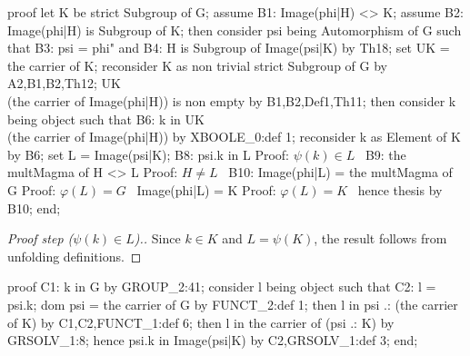 \nwenddocs{}\endmoddef\nwstartdeflinemarkup{}\nwenddeflinemarkup
proof
  let K be strict Subgroup of G;
  assume B1: Image(phi|H) <> K;
  assume B2: Image(phi|H) is Subgroup of K;
  then consider psi being Automorphism of G such that
  B3: psi = phi" and
  B4: H is Subgroup of Image(psi|K)
  by Th18;
  set UK = the carrier of K;
  reconsider K as non trivial strict Subgroup of G by A2,B1,B2,Th12;
  UK \\ (the carrier of Image(phi|H)) is non empty by B1,B2,Def1,Th11;
  then consider k being object such that
  B6: k in UK \\ (the carrier of Image(phi|H))
  by XBOOLE_0:def 1;
  reconsider k as Element of K by B6;
  set L = Image(psi|K);
  B8: psi.k in L
  \LA{}Proof: $\psi(k)\in L$~{\nwtagstyle{}}\RA{}
  B9: the multMagma of H <> L
  \LA{}Proof: $H\neq L$~{\nwtagstyle{}}\RA{}
  B10: Image(phi|L) = the multMagma of G
  \LA{}Proof: $\varphi(L)=G$~{\nwtagstyle{}}\RA{}
  Image(phi|L) = K
  \LA{}Proof: $\varphi(L) = K$~{\nwtagstyle{}}\RA{}
  hence thesis by B10;
end;
\nwendcode{}\nwdocspar

\begin{proof}[Proof step ($\psi(k)\in L$).]
Since $k\in K$ and $L=\psi(K)$, the result follows from unfolding definitions.
\end{proof}

\nwenddocs{}\endmoddef\nwstartdeflinemarkup{}\nwenddeflinemarkup
proof
  C1: k in G by GROUP_2:41;
  consider l being object such that
  C2: l = psi.k;
  dom psi = the carrier of G by FUNCT_2:def 1;
  then l in psi .: (the carrier of K) by C1,C2,FUNCT_1:def 6;
  then l in the carrier of (psi .: K) by GRSOLV_1:8;
  hence psi.k in Image(psi|K) by C2,GRSOLV_1:def 3;
end;
\nwendcode{}\nwdocspar

